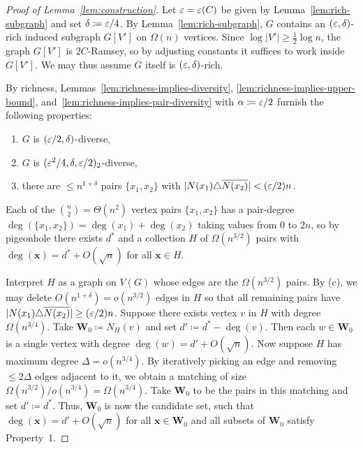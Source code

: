 \begin{proof}[Proof of Lemma~\ref{lem:construction}]

Let $\varepsilon = \varepsilon(C)$ be given by Lemma~\ref{lem:rich-subgraph} and set $\delta \coloneqq \varepsilon/4$. By Lemma~\ref{lem:rich-subgraph}, $G$ contains an $(\varepsilon, \delta)$-rich induced subgraph $G[V']$ on $\Omega(n)$ vertices. Since $\log |V'| \geq \frac{1}{2}\log n$, the graph $G[V']$ is $2C$-Ramsey, so by adjusting constants it suffices to work inside $G[V']$. We may thus assume $G$ itself is $(\varepsilon, \delta)$-rich.

By richness, Lemmas~\ref{lem:richness-implies-diversity}, \ref{lem:richness-implies-upper-bound}, and~\ref{lem:richness-implies-pair-diversity} with $\alpha \coloneqq \varepsilon/2$ furnish the following properties:
\begin{enumerate}
  \item[(a)] $G$ is $(\varepsilon/2, \delta)$-diverse,
  \item[(b)] $G$ is $(\varepsilon^2/4, \delta, \varepsilon/2)_2$-diverse,
  \item[(c)] there are $\leq n^{1+\delta}$ pairs
      $\{x_1, x_2\}$ with
      $|N(x_1) \triangle \overline{N(x_2)}| < (\varepsilon/2)n$.
\end{enumerate}

Each of the $\binom{n}{2} = \Theta(n^2)$ vertex pairs $\{x_1, x_2\}$ has a pair-degree $\deg(\{x_1, x_2\}) = \deg(x_1) + \deg(x_2)$ taking values from $0$ to $2n$, so by pigeonhole there exists $d^*$ and a collection $H$ of $\Omega(n^{3/2})$ pairs with $\deg(\mathbf{x}) = d^* + O(\sqrt{n})$ for all $\mathbf{x} \in H$. 

Interpret $H$ as a graph on $V(G)$ whose edges are the $\Omega(n^{3/2})$ pairs. By (c), we may delete $O(n^{1+\delta}) = o(n^{3/2})$ edges in $H$ so that all remaining pairs have $|N(x_1) \triangle \overline{N(x_2)}| \geq (\varepsilon/2)n$. Suppose there exists vertex $v$ in $H$ with degree $\Omega(n^{3/4})$. Take $\mathbf{W}_0 \coloneqq N_H(v)$ and set $d' \coloneqq d^* - \deg(v)$. Then each $w \in \mathbf{W}_0$ is a single vertex with degree $\deg(w) = d' + O(\sqrt{n})$. Now suppose $H$ has maximum degree $\Delta = o(n^{3/4})$. By iteratively picking an edge and removing $\leq 2\Delta$ edges adjacent to it, we obtain a matching of size $\Omega(n^{3/2})/o(n^{3/4}) = \Omega(n^{3/4})$. Take $\mathbf{W}_0$ to be the pairs in this matching and set $d' \coloneqq d^*$. Thus, $\mathbf{W}_0$ is now the candidate set, such that $\deg(\mathbf{x}) = d' + O(\sqrt{n})$ for all $\mathbf{x} \in \mathbf{W}_0$ and all subsets of $\mathbf{W}_0$ satisfy Property~1.


\end{proof}
